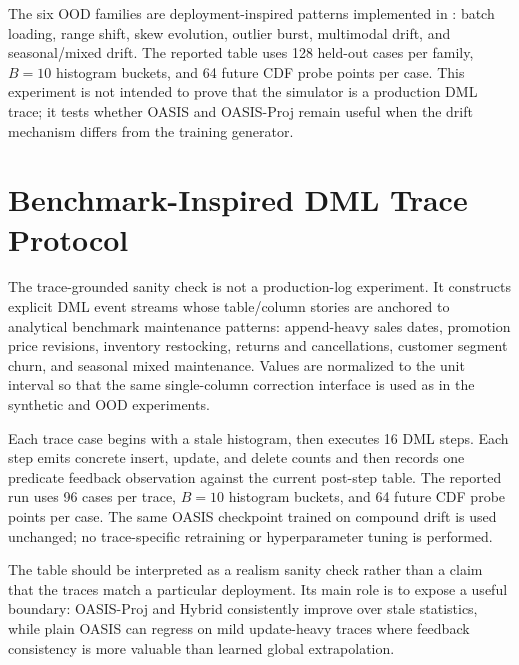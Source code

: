 \documentclass[runningheads]{llncs}
\begin{document}
The six OOD families are deployment-inspired patterns implemented in
: batch loading, range shift, skew
evolution, outlier burst, multimodal drift, and seasonal/mixed drift. The
reported table uses 128 held-out cases per family, $B=10$ histogram buckets,
and 64 future CDF probe points per case. This experiment is not intended to
prove that the simulator is a production DML trace; it tests whether OASIS and
OASIS-Proj remain useful when the drift mechanism differs from the training
generator.

\section{Benchmark-Inspired DML Trace Protocol}
\label{sec:trace-drift-app}

The trace-grounded sanity check is not a production-log experiment. It
constructs explicit DML event streams whose table/column stories are anchored
to analytical benchmark maintenance patterns: append-heavy sales dates,
promotion price revisions, inventory restocking, returns and cancellations,
customer segment churn, and seasonal mixed maintenance. Values are normalized
to the unit interval so that the same single-column correction interface is
used as in the synthetic and OOD experiments.

Each trace case begins with a stale histogram, then executes 16 DML steps. Each
step emits concrete insert, update, and delete counts and then records one
predicate feedback observation against the current post-step table. The
reported run uses 96 cases per trace, $B=10$ histogram buckets, and 64 future
CDF probe points per case. The same OASIS checkpoint trained on compound drift
is used unchanged; no trace-specific retraining or hyperparameter tuning is
performed.



The table should be interpreted as a realism sanity check rather than a claim
that the traces match a particular deployment. Its main role is to expose a
useful boundary: OASIS-Proj and Hybrid consistently improve over stale
statistics, while plain OASIS can regress on mild update-heavy traces where
feedback consistency is more valuable than learned global extrapolation.
\end{document}
